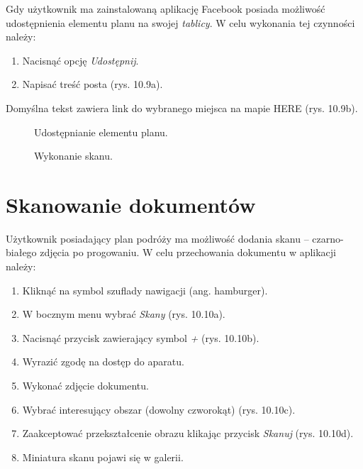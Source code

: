 \par Gdy użytkownik ma zainstalowaną aplikację Facebook posiada możliwość udostępnienia elementu planu na swojej \textit{tablicy}. W celu wykonania tej czynności należy:
\begin{enumerate}
\item Nacisnąć opcję \textit{Udostępnij}.
\item Napisać treść posta (rys. 10.9a).
\end{enumerate}
Domyślna tekst zawiera link do wybranego miejsca na mapie HERE (rys. 10.9b).

\begin{figure}[h]

\centering
\null\hfill
{}
\hfill
{}
\hfill\null

\caption{Udostępnianie elementu planu.}
\label{fig:podrecznik8}
\end{figure}
\FloatBarrier

\begin{figure}[h]

\centering
\null\hfill
{}
\hfill
{}
\hfill\null

\null\hfill
{}
\hfill
{}
\hfill\null

\caption{Wykonanie skanu.}
\label{fig:podrecznik8}
\end{figure}
\FloatBarrier

\section{Skanowanie dokumentów}
Użytkownik posiadający plan podróży ma możliwość dodania skanu – czarno-białego zdjęcia po progowaniu.
W celu przechowania dokumentu w aplikacji należy:
\begin{enumerate}
\item Kliknąć na symbol szuflady nawigacji (ang. hamburger).
\item W bocznym menu wybrać \textit{Skany} (rys. 10.10a).
\item Nacisnąć przycisk zawierający symbol \textit{+} (rys. 10.10b).
\item Wyrazić zgodę na dostęp do aparatu.
\item Wykonać zdjęcie dokumentu.
\item Wybrać interesujący obszar (dowolny czworokąt) (rys. 10.10c).
\item Zaakceptować przekształcenie obrazu klikając przycisk \textit{Skanuj} (rys. 10.10d).
\item Miniatura skanu pojawi się w galerii.
\end{enumerate}


